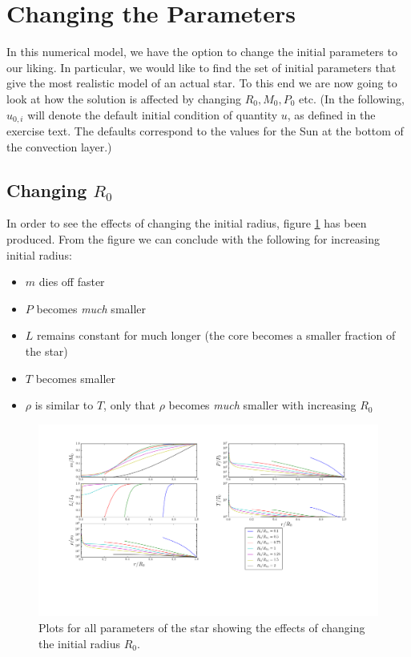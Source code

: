 \documentclass[11pt,twocolumn]{article}
\begin{document}
\section{Changing the Parameters}
In this numerical model, we have the option to change the initial
parameters to our liking. In particular, we would like to find the set
of initial parameters that give the most realistic model of an actual
star. To this end we are now going to look at how the solution is
affected by changing $R_0,M_0, P_0$ etc. (In the following, $u_{0,i}$
will denote the default initial condition of quantity $u$, as defined
in the exercise text. The defaults correspond to the values for the
Sun at the bottom of the convection layer.)

\subsection{Changing $R_0$}
In order to see the effects of changing the initial radius, figure
\ref{fig:R-variation} has been produced. From the figure we can
conclude with the following for increasing initial radius:

\begin{itemize}
  \item $m$ dies off faster
  \item $P$ becomes \emph{much} smaller
\item $L$ remains constant for much longer (the core becomes a smaller
  fraction of the star)
\item $T$ becomes smaller
\item $\rho$ is similar to $T$, only that $\rho$ becomes \emph{much}
  smaller with increasing $R_0$
\end{itemize}

\begin{figure}[ht]
  \centering
  \includegraphics[width=\linewidth]{fig/R_variation.png}
  \caption{\label{fig:R-variation} Plots for all parameters of the star
  showing the effects of changing the initial radius $R_0$.}
\end{figure}
\end{document}
